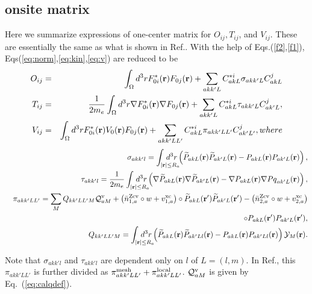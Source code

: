 \documentclass[twocolumn,showpacs,preprintnumbers,amsmath,amssymb,floatfix]{revtex4-1}
\newcommand{\bfr}{{\bf r}}
\newcommand{\YY}{{\cal Y}}
\newcommand{\req}[1]{\mbox{Eq.~\!(\ref{#1})}}
\def\barnzcv{\bar{n}^{\rm Zcv}}
\def\RR{w}
\def\inta{\int_{|\bfr|\leq R_a}\!\!\!\!\!\!\!\!\!\!\!\!}
\begin{document}
\begin{widetext}
\section{onsite matrix}
\label{onsitematrix}
Here we summarize expressions of one-center matrix for $O_{ij},T_{ij}$, and
$V_{ij}$. These are essentially the same as what is shown in Ref.\cite{lmfchap}.
With the help of Eqs.(\ref{f2},\ref{f1}), Eqs(\ref{eq:norm},\ref{eq:kin},\ref{eq:v})
are reduced to be
\begin{eqnarray}
O_{ij} &=&\int_\Omega d^3r  F^*_{0i}(\bfr)F_{0j}(\bfr)
  + \sum_{akk'L} C^{*i}_{akL} \sigma_{akk'L} C^{j}_{akL}   \label{eq:normmat1}\\
T_{ij} &=&\frac{1}{2m_e}\int_\Omega d^3r  \nabla F^*_{0i}(\bfr) \nabla F_{0j}(\bfr)
  + \sum_{akk'L} C^{*i}_{akL} \tau_{akk'L} C^{j}_{ak'L},   \label{eq:kinmmat1}\\
V_{ij}&=&\int_\Omega d^3r  F^*_{0i}(\bfr)V_0(\bfr)F_{0j}(\bfr)
  + \sum_{akk'LL'} C^{*i}_{akL} \pi_{akk'LL'} C^{j}_{ak'L'} \label{eq:vpot},
where
\end{eqnarray}
\begin{eqnarray}
&&\sigma_{akk'l}= \inta d^3r  
 \left(\widetilde{P}_{akL}(\bfr) \widetilde{P}_{ak'L}(\bfr)
- {P}_{akL}(\bfr) {P}_{ak'L}(\bfr)\right), \label{matsig} \\
&&\tau_{akk'l}= \frac{1}{2m_e}\inta d^3r  
 \left(\nabla \widetilde{P}_{akL}(\bfr) \nabla \widetilde{P}_{ak'L}(\bfr)
-\nabla {P}_{akL}(\bfr) \nabla {Pq}_{ak'L}(\bfr)\right), \label{mattau}\\
&&\pi_{akk'LL'}= \sum_M Q_{kk'LL'M} {\cal Q}^{\rm v}_{aM} +
  \left(\barnzcv_{1,a} \circ \RR + v^{\rm xc}_{1,a} \right)\circ
  \widetilde{P}_{akL}(\bfr') \widetilde{P}_{ak'L}(\bfr')
- \left(\barnzcv_{2,a} \circ \RR + v^{\rm xc}_{2,a} \right) \nonumber \\
&&\circ
  {P}_{akL}(\bfr') {P}_{ak'L}(\bfr'), \label{matpi}\\
&&Q_{kk'LL'M}=\inta d^3r
\left( \widetilde{P}_{akL}(\bfr) \widetilde{P}_{ak'Ll}(\bfr)
- {P}_{akL}(\bfr) {P}_{ak'Ll}(\bfr)\right) \YY_M(\bfr) \label{qmom}. 
\end{eqnarray}
\end{widetext}
Note that $\sigma_{akk'l}$ and $\tau_{akk'l}$ are dependent only on
$l$ of $L=(l,m)$.
In Ref.\cite{lmfchap}, this $\pi_{akk'LL'}$ is further divided as
$\pi^{\rm mesh}_{akk'LL'} + \pi^{\rm local}_{akk'LL'}$.
${\cal Q}^{\rm v}_{aM}$ is given by \req{eq:calqdef}.

\end{document}
